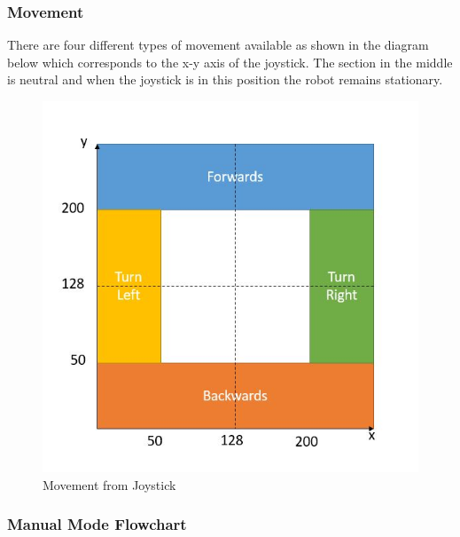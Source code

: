 \documentclass{article}
\begin{document}
	\subsubsection{Movement}
	
	There are four different types of movement available as shown in the diagram below which corresponds to the x-y axis of the joystick. The section in the middle is neutral and when the joystick is in this position the robot remains stationary.
	
	\begin{figure}[h]
		\includegraphics[scale=0.8]{Manual_mode_movement.jpg}
		\centering
		\caption{Movement from Joystick}
	\end{figure}
	
	
	\subsubsection{Manual Mode Flowchart}
	
\end{document}

